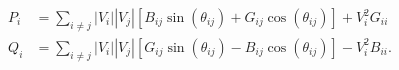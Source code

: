         

        


\begin{equation}
    \begin{aligned}
        P_i &= \sum_{i\neq j} |V_i||V_j| \left[ B_{ij} \sin(\theta_{ij}) + G_{ij} \cos(\theta_{ij}) \right] + V_i^2 G_{ii} \\ 
        Q_i &= \sum_{i\neq j} |V_i||V_j| \left[ G_{ij} \sin(\theta_{ij}) - B_{ij} \cos(\theta_{ij}) \right] - V_i^2 B_{ii}.
    \end{aligned}
    \label{eq:power_injections}
\end{equation}

